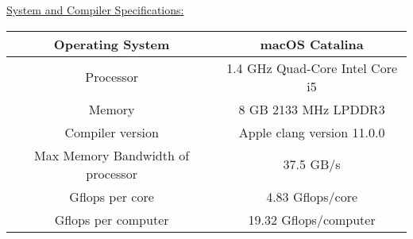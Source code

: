 \documentclass[12pt,letterpaper]{article}
\begin{document}
{\underline{System and Compiler Specifications:}} \\

\begin{tabular}{ |c|c| } 
 \hline
 Operating System & macOS Catalina  \\
 \hline
 Processor & 1.4 GHz Quad-Core Intel Core i5 \\
 \hline
 Memory & 8 GB 2133 MHz LPDDR3  \\ 
 \hline 
Compiler version & Apple clang version 11.0.0 \\

 \hline
 Max Memory Bandwidth of processor & 37.5 GB/s \\
 \hline
 Gflops per core & 4.83	Gflops/core\\
 \hline
 Gflops per computer & 19.32 Gflops/computer\\
 \hline
\end{tabular}
\\\



  
     
      
\end{document}
